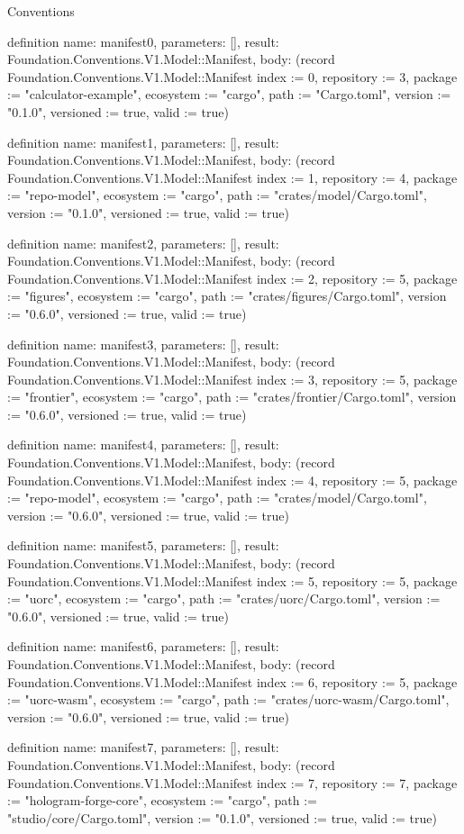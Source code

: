\begin{lexlean}{Conventions}
\begin{semanticmodule}
definition{
  name: manifest0,
  parameters: [],
  result: Foundation.Conventions.V1.Model::Manifest,
  body: (record Foundation.Conventions.V1.Model::Manifest {index := 0, repository := 3, package := "calculator-example", ecosystem := "cargo", path := "Cargo.toml", version := "0.1.0", versioned := true, valid := true})
}

definition{
  name: manifest1,
  parameters: [],
  result: Foundation.Conventions.V1.Model::Manifest,
  body: (record Foundation.Conventions.V1.Model::Manifest {index := 1, repository := 4, package := "repo-model", ecosystem := "cargo", path := "crates/model/Cargo.toml", version := "0.1.0", versioned := true, valid := true})
}

definition{
  name: manifest2,
  parameters: [],
  result: Foundation.Conventions.V1.Model::Manifest,
  body: (record Foundation.Conventions.V1.Model::Manifest {index := 2, repository := 5, package := "figures", ecosystem := "cargo", path := "crates/figures/Cargo.toml", version := "0.6.0", versioned := true, valid := true})
}

definition{
  name: manifest3,
  parameters: [],
  result: Foundation.Conventions.V1.Model::Manifest,
  body: (record Foundation.Conventions.V1.Model::Manifest {index := 3, repository := 5, package := "frontier", ecosystem := "cargo", path := "crates/frontier/Cargo.toml", version := "0.6.0", versioned := true, valid := true})
}

definition{
  name: manifest4,
  parameters: [],
  result: Foundation.Conventions.V1.Model::Manifest,
  body: (record Foundation.Conventions.V1.Model::Manifest {index := 4, repository := 5, package := "repo-model", ecosystem := "cargo", path := "crates/model/Cargo.toml", version := "0.6.0", versioned := true, valid := true})
}

definition{
  name: manifest5,
  parameters: [],
  result: Foundation.Conventions.V1.Model::Manifest,
  body: (record Foundation.Conventions.V1.Model::Manifest {index := 5, repository := 5, package := "uorc", ecosystem := "cargo", path := "crates/uorc/Cargo.toml", version := "0.6.0", versioned := true, valid := true})
}

definition{
  name: manifest6,
  parameters: [],
  result: Foundation.Conventions.V1.Model::Manifest,
  body: (record Foundation.Conventions.V1.Model::Manifest {index := 6, repository := 5, package := "uorc-wasm", ecosystem := "cargo", path := "crates/uorc-wasm/Cargo.toml", version := "0.6.0", versioned := true, valid := true})
}

definition{
  name: manifest7,
  parameters: [],
  result: Foundation.Conventions.V1.Model::Manifest,
  body: (record Foundation.Conventions.V1.Model::Manifest {index := 7, repository := 7, package := "hologram-forge-core", ecosystem := "cargo", path := "studio/core/Cargo.toml", version := "0.1.0", versioned := true, valid := true})
}


\end{semanticmodule}
\end{lexlean}
